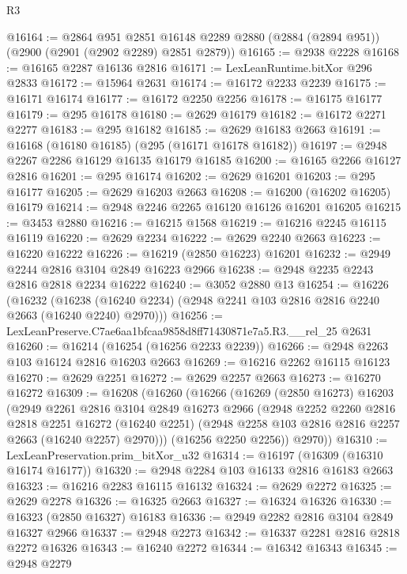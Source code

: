 \begin{lexlean}{R3}
\begin{coremodule}
@16164 := @2864
    @951
    @2851
    @16148
    @2289
    @2880
    (@2884 (@2894 @951))
    (@2900 (@2901 (@2902 @2289) @2851 @2879))
@16165 := @2938 @2228
@16168 := @16165 @2287 @16136 @2816
@16171 := LexLeanRuntime.bitXor @296 @2833
@16172 := @15964 @2631
@16174 := @16172 @2233 @2239
@16175 := @16171 @16174
@16177 := @16172 @2250 @2256
@16178 := @16175 @16177
@16179 := @295 @16178
@16180 := @2629 @16179
@16182 := @16172 @2271 @2277
@16183 := @295 @16182
@16185 := @2629 @16183 @2663
@16191 := @16168 (@16180 @16185) (@295 (@16171 @16178 @16182))
@16197 := @2948 @2267 @2286 @16129 @16135 @16179 @16185
@16200 := @16165 @2266 @16127 @2816
@16201 := @295 @16174
@16202 := @2629 @16201
@16203 := @295 @16177
@16205 := @2629 @16203 @2663
@16208 := @16200 (@16202 @16205) @16179
@16214 := @2948 @2246 @2265 @16120 @16126 @16201 @16205
@16215 := @3453 @2880
@16216 := @16215 @1568
@16219 := @16216 @2245 @16115 @16119
@16220 := @2629 @2234
@16222 := @2629 @2240 @2663
@16223 := @16220 @16222
@16226 := @16219 (@2850 @16223) @16201
@16232 := @2949 @2244 @2816 @3104 @2849 @16223 @2966
@16238 := @2948 @2235 @2243 @2816 @2818 @2234 @16222
@16240 := @3052 @2880 @13
@16254 := @16226
    (@16232 (@16238 (@16240 @2234) (@2948 @2241 @103 @2816 @2816 @2240 @2663 (@16240 @2240) @2970)))
@16256 := LexLeanPreserve.C7ae6aa1bfcaa9858d8ff71430871e7a5.R3.__rel_25 @2631
@16260 := @16214 (@16254 (@16256 @2233 @2239))
@16266 := @2948 @2263 @103 @16124 @2816 @16203 @2663
@16269 := @16216 @2262 @16115 @16123
@16270 := @2629 @2251
@16272 := @2629 @2257 @2663
@16273 := @16270 @16272
@16309 := @16208
    (@16260
      (@16266
        (@16269
          (@2850 @16273)
          @16203
          (@2949
            @2261
            @2816
            @3104
            @2849
            @16273
            @2966
            (@2948
              @2252
              @2260
              @2816
              @2818
              @2251
              @16272
              (@16240 @2251)
              (@2948 @2258 @103 @2816 @2816 @2257 @2663 (@16240 @2257) @2970)))
          (@16256 @2250 @2256))
        @2970))
@16310 := LexLeanPreservation.prim_bitXor_u32
@16314 := @16197 (@16309 (@16310 @16174 @16177))
@16320 := @2948 @2284 @103 @16133 @2816 @16183 @2663
@16323 := @16216 @2283 @16115 @16132
@16324 := @2629 @2272
@16325 := @2629 @2278
@16326 := @16325 @2663
@16327 := @16324 @16326
@16330 := @16323 (@2850 @16327) @16183
@16336 := @2949 @2282 @2816 @3104 @2849 @16327 @2966
@16337 := @2948 @2273
@16342 := @16337 @2281 @2816 @2818 @2272 @16326
@16343 := @16240 @2272
@16344 := @16342 @16343
@16345 := @2948 @2279

\end{coremodule}
\end{lexlean}
